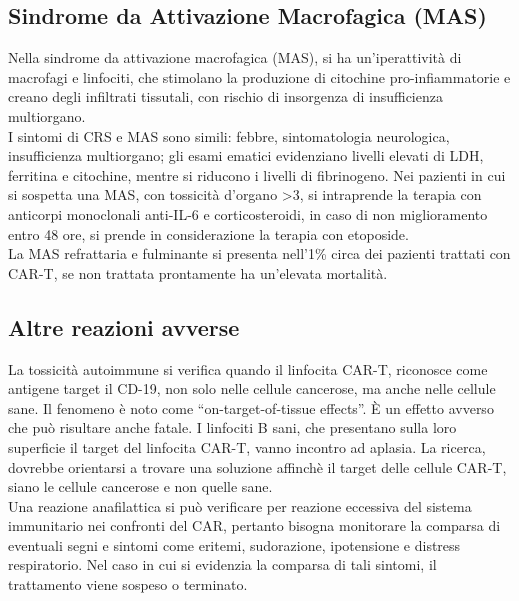 \subsection{Sindrome da Attivazione Macrofagica (MAS)}

Nella sindrome da attivazione macrofagica (MAS), si ha un’iperattività di macrofagi e linfociti, che stimolano la 
produzione di citochine pro-infiammatorie e creano degli infiltrati tissutali, con rischio di insorgenza di 
insufficienza multiorgano.\\
I sintomi di CRS e MAS sono simili: febbre, sintomatologia neurologica, insufficienza multiorgano; 
gli esami ematici evidenziano livelli elevati di LDH, ferritina e citochine, mentre si
riducono i livelli di fibrinogeno\cite{EMATOCART}.
Nei pazienti in cui si sospetta una MAS, con tossicità d’organo >3, si intraprende la terapia con anticorpi monoclonali 
anti-IL-6 e corticosteroidi, in caso di non miglioramento entro 48 ore, 
si prende in considerazione la terapia con etoposide.\\
La MAS refrattaria e fulminante si presenta nell’1\% circa dei pazienti trattati con CAR-T, 
se non trattata prontamente ha un’elevata mortalità\cite{EMATOCART}.

\subsection{Altre reazioni avverse}

La tossicità autoimmune si verifica quando il linfocita CAR-T, riconosce come antigene target il CD-19, non solo nelle 
cellule cancerose, ma anche nelle cellule sane.
Il fenomeno è noto come “on-target-of-tissue effects”. È un effetto avverso che può risultare anche fatale.
I linfociti B sani, che presentano sulla loro superficie il target del linfocita CAR-T, vanno 
incontro ad aplasia. La ricerca, dovrebbe orientarsi a trovare una soluzione affinchè il target delle cellule CAR-T, 
siano le cellule cancerose e non quelle sane\cite{Frontiers}.\\

Una reazione anafilattica si può verificare per reazione eccessiva del sistema immunitario nei confronti del CAR, 
pertanto bisogna monitorare la comparsa di eventuali segni e sintomi come eritemi, 
sudorazione, ipotensione e distress respiratorio\cite{EMATOCART}.
Nel caso in cui si evidenzia la comparsa di tali sintomi, il trattamento viene sospeso o terminato\cite{Frontiers}.\\

